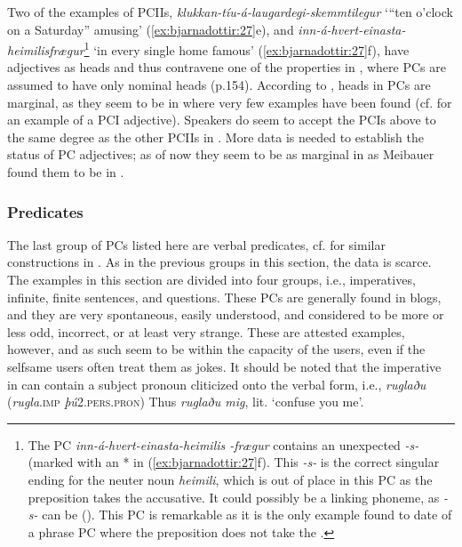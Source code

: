 \documentclass[output=paper]{LSP/langsci}
\begin{document}
\begin{xlist}
Two of the examples of PCIIs,  \textit{klukkan-tíu-á-laugardegi-skemmtilegur} ‘“ten o’clock on a Saturday” amusing’ (\ref{ex:bjarnadottir:27}e), and \textit{inn-á-hvert-einasta-heimilisfrægur}\footnote{The PC \textit{inn-á-hvert-einasta-heimilis -frægur} contains an unexpected \textit{-s-} (marked with an * in (\ref{ex:bjarnadottir:27}f). This \textit{-s-} is the correct  singular ending for the neuter noun \textit{heimili}, which is out of place in this PC as the preposition takes the accusative. It could possibly be a linking phoneme, as \textit{-s-} can be (\citealt{Bjarnadóttir19962005}). This PC is remarkable as it is the only example found to date of a  phrase PC where the preposition does not take the .} ‘in every single home famous’ (\ref{ex:bjarnadottir:27}f), have adjectives as heads and thus contravene one of the properties in \citet{Trips2016}, where  PCs are assumed to have only nominal heads (p.154). According to \citet[236--237]{Meibauer2007},  heads in PCs are marginal, as they seem to be in  where very few examples have been found (cf.  for an example of a PCI adjective). Speakers do seem to accept the PCIs above to the same degree as the other PCIIs in . More data is needed to establish the status of PC adjectives; as of now they seem to be as marginal in  as Meibauer found them to be in . 

\subsubsection{Predicates}\label{sec:bjarnadottir:3.2.3}

The last group of  PCs listed here are verbal predicates, cf. \citet{Trips2016} for similar constructions in . As in the previous groups in this section, the data is scarce. The examples in this section are divided into four groups, i.e., imperatives, infinite, finite sentences, and questions. These PCs are generally found in blogs, and they are very spontaneous, easily understood, and considered to be more or less odd, incorrect, or at least very strange. These are attested examples, however, and as such seem to be within the capacity of the users, even if the selfsame users often treat them as jokes. It should be noted that the imperative in  can contain a subject pronoun cliticized onto the verbal form, i.e., \textit{ruglaðu} (\textit{rugla}\textsc{.imp} \textit{þú}\textsc{2.pers.pron}) Thus \textit{ruglaðu mig}, lit. ‘confuse you me’.


\end{xlist}
\end{document}
